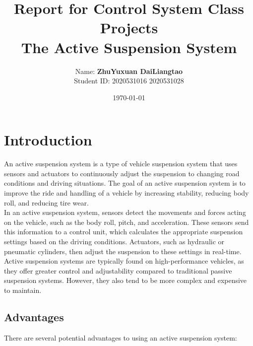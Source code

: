 \documentclass{article}
\title{
    \vspace{2in}
    {\large{\textbf{Report for Control System Class Projects}}}\\
    \textmd{\textbf{The Active Suspension System}}\\
    \vspace{2in}
}
\author{
	Name: \textbf{ZhuYuxuan DaiLiangtao} \\
	Student ID: 2020531016 2020531028}
\date{\today}
\begin{document}
\maketitle
\pagebreak

\section{Introduction}

An active suspension system is a type of vehicle suspension system that uses sensors 
and actuators to continuously adjust the suspension to changing road conditions and driving situations. 
The goal of an active suspension system is to improve the ride and handling of a vehicle by increasing stability, 
reducing body roll, and reducing tire wear.\\

In an active suspension system, 
sensors detect the movements and forces acting on the vehicle, 
such as the body roll, pitch, and acceleration. 
These sensors send this information to a control unit, 
which calculates the appropriate suspension settings based on the driving conditions. 
Actuators, such as hydraulic or pneumatic cylinders, then adjust the suspension to these settings in real-time.\\

Active suspension systems are typically found on high-performance vehicles, 
as they offer greater control and adjustability compared to traditional passive suspension systems. 
However, they also tend to be more complex and expensive to maintain.\\

\subsection{Advantages}

There are several potential advantages to using an active suspension system:
\end{document}
